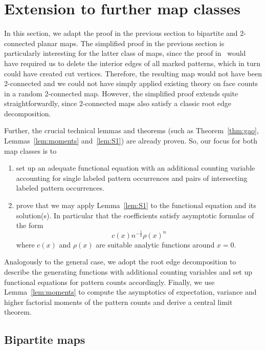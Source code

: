 \documentclass[reqno, 11pt]{amsart}
\theoremstyle{definition}
\theoremstyle{remark}
\numberwithin{equation}{section}
\begin{document}
\section{Extension to further map classes}

In this section, we adapt the proof in the previous section to bipartite and 2-connected planar maps. The simplified proof in the previous section is particularly interesting for the latter class of maps, since the proof in~\cite{patternocc} would have required us to delete the interior edges of all marked patterns, which in turn could have created cut vertices. Therefore, the resulting map would not have been 2-connected and we could not have simply applied existing theory on face counts in a random 2-connected map. However, the simplified proof extends quite straightforwardly, since 2-connected maps also satisfy a classic root edge decomposition.

Further, the crucial technical lemmas and theorems (such as Theorem~\ref{thm:gao}, Lemmas~\ref{lem:moments} and~\ref{lem:S1}) are already proven. So, our focus for both map classes is to
\begin{enumerate}
    \item set up an adequate functional equation with an additional counting variable accounting for single labeled pattern occurrences and pairs of intersecting labeled pattern occurrences.
    \item prove that we may apply Lemma~\ref{lem:S1} to the functional equation and its solution(s). In particular that the coefficients satisfy asymptotic formulas of the form
    \[
        c(x)n^{-\frac{5}{2}}\rho(x)^n
    \]
    where $c(x)$ and $\rho(x)$ are suitable analytic functions around $x=0$.
\end{enumerate}

Analogously to the general case, we adopt the root edge decomposition to describe the generating functions with additional counting variables and set up functional equations for pattern counts accordingly. Finally, we use Lemma~\ref{lem:moments} to compute the asymptotics of expectation, variance and higher factorial moments of the pattern counts and derive a central limit theorem.

\subsection{Bipartite maps}
\end{document}
